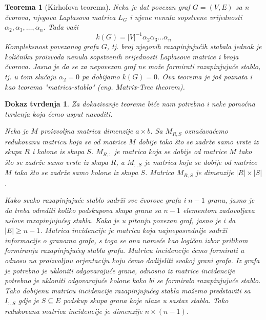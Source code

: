 \documentclass[11pt]{article}
\newtheorem{theorem}{Teorema}
\newtheorem*{custom_proof}{Dokaz tvrđenja}
\begin{document}
		\begin{theorem}[Kirhofova teorema]
		Neka je dat povezan graf $G= (V,E) $ sa n čvorova, njegova Laplasova matrica $L_G$ i njene nenula sopstvene vrijednosti $\alpha_2, \alpha_3, \dots, \alpha_n$. Tada važi
		\[
			k(G) = |V|^{-1}\alpha_2 \alpha_3 \dots \alpha_n
		\]
		Kompleksnost povezanog grafa $G$, tj. broj njegovih razapinjujućih stabala jednak je količniku proizvoda nenula sopstvenih vrijednosti Laplasove matrice i broja čvorova. 
		Jasno je da se za nepovezan graf ne može formirati razapinjujuće stablo, tj. u tom slučaju $\alpha_2 = 0$ pa dobijamo $k(G) = 0$. 
		Ova teorema je još poznata i kao teorema "matrica-stablo" (eng. Matrix-Tree theorem).
		\end{theorem}
	
		\begin{custom_proof} Za dokazivanje teoreme biće nam potrebna i neke pomoćna tvrđenja koja ćemo usput navoditi.

		Neka je $M$ proizvoljna matrica dimenzije $a \times b$. Sa $M_{R,S}$ označavaćemo redukovanu matricu koja se od matrice $M$ dobije tako što se zadrže samo vrste iz skupa $R$ i kolone is skupa $S$. 
		$M_{R,:}$ je matrica koja se dobije od matrice $M$ tako što se zadrže samo vrste iz skupa $R$, a $M_{:,S}$ je matrica koja se dobije od matrice $M$ tako što se zadrže samo kolone iz skupa $S$.
		Matrica $M_{R,S}$ je dimenzije $|R| \times |S|$.
	
		Kako svako razapinjujuće stablo sadrži sve čvorove grafa i $n-1$ granu,
		jasno je da treba odrediti koliko podskupova skupa grana sa $n-1$ elementom zadovoljava uslove razapinjujućeg stabla.
		Kako je u pitanju povezan graf, jasno je i da $|E| \geq n-1$.
		Matrica incidencije je matrica koja najneposrednije sadrži informacije o granama grafa,
		s toga se ona nameće kao logičan izbor prilikom formiranja razapinjujućeg stabla grafa. Matricu incidencije ćemo formirati u odnosu na proizvoljnu orjentaciju koju ćemo dodijeliti svakoj grani grafa.
	    Iz grafa je potrebno je ukloniti odgovarajuće grane, odnosno iz matrice incidencije potrebno je ukloniti odgovarajuće kolone kako bi se formiralo razapinjujuće stablo. 
		Tako dobijenu matricu incidencije razapinjujućeg stabla možemo predstaviti sa $I_{:,S}$ gdje je $S \subseteq E$ podskup skupa grana koje ulaze u sastav stabla.
		Tako redukovana matrica incidencije je dimenzije $n \times (n - 1)$.
	

\end{custom_proof}
\end{document}

